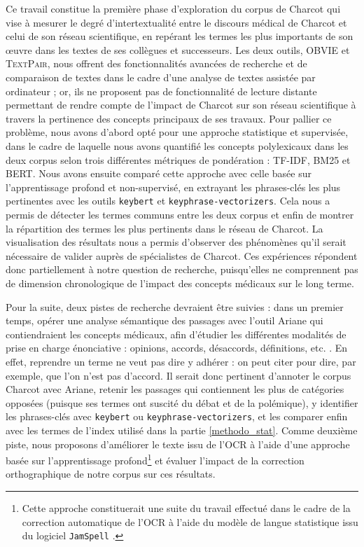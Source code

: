 



Ce travail constitue la première phase d'exploration du corpus de Charcot qui vise à mesurer le degré d'intertextualité entre le discours médical de Charcot et celui de son réseau scientifique, en repérant les termes les plus importants de son \oe{}uvre dans les textes de ses collègues et successeurs. Les deux outils, \textsc{OBVIE} et \textsc{TextPair}, nous offrent des fonctionnalités avancées de recherche et de comparaison de textes dans le cadre d'une analyse de textes assistée par ordinateur ; or, ils ne proposent pas de fonctionnalité de lecture distante permettant de rendre compte de l'impact de Charcot sur son réseau scientifique à travers la pertinence des concepts principaux de ses travaux. Pour pallier ce problème, nous avons d'abord opté pour une approche statistique et supervisée, dans le cadre de laquelle nous avons quantifié les concepts polylexicaux dans les deux corpus selon trois différentes métriques de pondération : \textsc{TF-IDF}, \textsc{BM25} et \textsc{BERT}. Nous avons ensuite comparé cette approche avec celle basée sur l'apprentissage profond et non-supervisé, en extrayant les phrases-clés les plus pertinentes avec les outils \texttt{keybert} et \texttt{keyphrase-vectorizers}. Cela nous a permis de détecter les termes communs entre les deux corpus et enfin de montrer la répartition des termes les plus pertinents dans le réseau de Charcot. La visualisation des résultats nous a permis d'observer des phénomènes qu'il serait nécessaire de valider auprès de spécialistes de Charcot. Ces expériences répondent donc partiellement à notre question de recherche, puisqu'elles ne comprennent pas de dimension chronologique de l'impact des concepts médicaux sur le long terme.

Pour la suite, deux pistes de recherche devraient être suivies : dans un premier temps, opérer une analyse sémantique des passages avec l'outil Ariane qui contiendraient les concepts médicaux, afin d'étudier les différentes modalités de prise en charge énonciative : opinions, accords, désaccords, définitions, etc. \citep{alrahabi2021ariane}. En effet, reprendre un terme ne veut pas dire y adhérer : on peut citer pour dire, par exemple, que l'on n'est pas d'accord. 
Il serait donc pertinent d'annoter le corpus Charcot avec Ariane, retenir les passages qui contiennent les plus de catégories \og{}opposées\fg{} (puisque ses termes ont suscité du débat et de la polémique), y identifier les phrases-clés avec \texttt{keybert} ou \texttt{keyphrase-vectorizers}, et les comparer enfin avec les termes de l'index utilisé dans la partie \ref{methodo_stat}. Comme deuxième piste, nous proposons d'améliorer le texte issu de l'\textsc{OCR} à l'aide d'une approche basée sur l'apprentissage profond\footnote{Cette approche constituerait une suite du travail effectué dans le cadre de la correction automatique de l'\textsc{OCR} à l'aide du modèle de langue statistique issu du logiciel \texttt{JamSpell} \citep{petkovic2022impact}.} et évaluer l'impact de la correction orthographique de notre corpus sur ces résultats.




